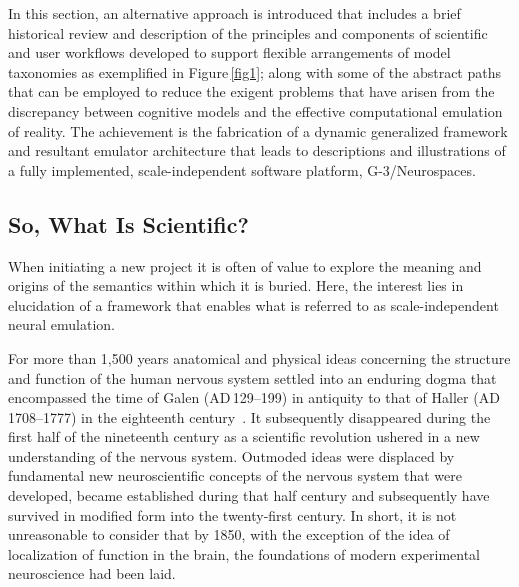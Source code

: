 \documentclass[10pt,letterpaper]{article}
\begin{document}


In this section, an alternative approach is introduced that includes a brief historical review and description of the principles and components of scientific and user workflows developed to support flexible arrangements of model taxonomies as exemplified in Figure\,\ref{fig1}; along with some of the abstract paths that can be employed to reduce the exigent problems that have arisen from the discrepancy between cognitive models and the effective computational emulation of reality. The achievement is the fabrication of a dynamic generalized framework and resultant emulator architecture that leads to descriptions and illustrations of a fully implemented, scale-independent software platform, G-3/Neurospaces.

\subsection*{So, What Is Scientific?}

When initiating a new project it is often of value to explore the meaning and origins of the semantics within which it is buried. Here, the interest lies in elucidation of a framework that enables what is referred to as scale-independent neural emulation.

For more than 1,500 years anatomical and physical ideas concerning the structure and function of the human nervous system settled into an enduring dogma that encompassed the time of Galen ({\small{AD}}\,129--199) in antiquity to that of Haller ({\small{AD}}\,1708--1777) in the eighteenth century~\cite{clarke87}. It subsequently disappeared during the first half of the nineteenth century as a scientific revolution ushered in a new understanding of the nervous system. Outmoded ideas were displaced by fundamental new neuroscientific concepts of the nervous system that were developed, became established during that half century and subsequently have survived in modified form into the twenty-first century. In short, it is not unreasonable to consider that by 1850, with the exception of the idea of localization of function in the brain, the foundations of modern experimental neuroscience had been laid.
\end{document}
